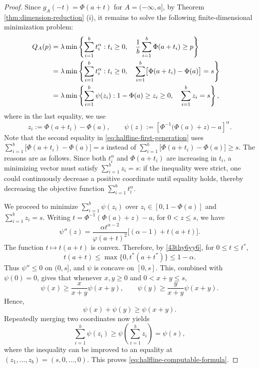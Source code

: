 \documentclass[a4paper, 11pt]{article}
\newcommand{\1}{\mathbf 1}
\theoremstyle{plain}
\begin{document}
\begin{proof}
Since
\(g_A(-t)=\Phi(a+t)\) for $A=(-\infty,a]$, by Theorem \ref{thm:dimension-reduction} (i), it remains to solve the following finite-dimensional minimization problem:
\begin{align}
  Q_A(p)
  &=\lambda\min\left\{
      \sum_{i=1}^b t_i^\alpha:
      t_i\ge0,\quad
      \frac1b\sum_{i=1}^b\Phi(a+t_i)\ge p
    \right\}\cr
  &=\lambda\min\left\{
      \sum_{i=1}^b t_i^\alpha:
      t_i\ge0,\quad
      \sum_{i=1}^b\bigl[\Phi(a+t_i)-\Phi(a)\bigr]= s
    \right\}\cr
     &=\lambda\min\left\{
      \sum^b_{i=1}\psi(z_i):
      1-\Phi(a)\ge z_i\ge0,\quad
      \sum_{i=1}^bz_i=s
    \right\},
  \label{eq:halfline-first-generation}
\end{align}
where in the last equality, we use
\[
  z_i:=\Phi(a+t_i)-\Phi(a),
  \qquad
  \psi(z):=\left[\Phi^{-1}\bigl(\Phi(a)+z\bigr)-a\right]^\alpha.
\]
Note that the second equality in \eqref{eq:halfline-first-generation} uses $\sum_{i=1}^b\bigl[\Phi(a+t_i)-\Phi(a)\bigr]= s$ instead of $\sum_{i=1}^b\bigl[\Phi(a+t_i)-\Phi(a)\bigr]\geq s$. The reasons are as follows. Since both \(t_i^\alpha\) and
\(\Phi(a+t_i)\) are increasing in \(t_i\), a minimizing vector must satisfy
\(\sum^b_{i=1}z_i=s\): if the inequality were strict, one could continuously
decrease a positive coordinate until equality holds, thereby decreasing the
objective function $\sum_{i=1}^b t_i^\alpha$.
\par
We proceed to minimize \(\sum^b_{i=1}\psi(z_i)\) over
 $z_i\in[0,1-\Phi(a)]$ and \(\sum^b_{i=1}z_i=s\). Writing
\(t=\Phi^{-1}(\Phi(a)+z)-a\), for \(0<z\le s\), we have
\[
  \psi''(z)
  =\frac{\alpha t^{\alpha-2}}{\varphi(a+t)^2}
    \bigl[(\alpha-1)+t(a+t)\bigr].
\]
The function \(t\mapsto t(a+t)\) is convex. Therefore, by \eqref{43thy6yy6}, for
\(0\le t\le t^{*}\),
\[
  t(a+t)
  \le\max\{0,t^{*}(a+t^{*})\}
  \le1-\alpha.
\]
Thus \(\psi''\le0\) on
\((0,s]\), and \(\psi\) is concave on \([0,s]\). This, combined with \(\psi(0)=0\), gives that whenever \(x,y\ge0\) and \(0<x+y\le s\),
\[
  \psi(x)\ge\frac{x}{x+y}\psi(x+y),
  \qquad
  \psi(y)\ge\frac{y}{x+y}\psi(x+y).
\]
Hence,
\[
  \psi(x)+\psi(y)\ge\psi(x+y).
\]
Repeatedly merging two coordinates now yields
\[
  \sum_{i=1}^b\psi(z_i)
  \ge\psi\left(\sum_{i=1}^b z_i\right)
  =\psi(s),
\]
where the inequality can be improved to an equality at \((z_1,\ldots,z_b)=(s,0,\ldots,0)\). This proves
\eqref{eq:halfline-computable-formula}.
\end{proof}
\end{document}
